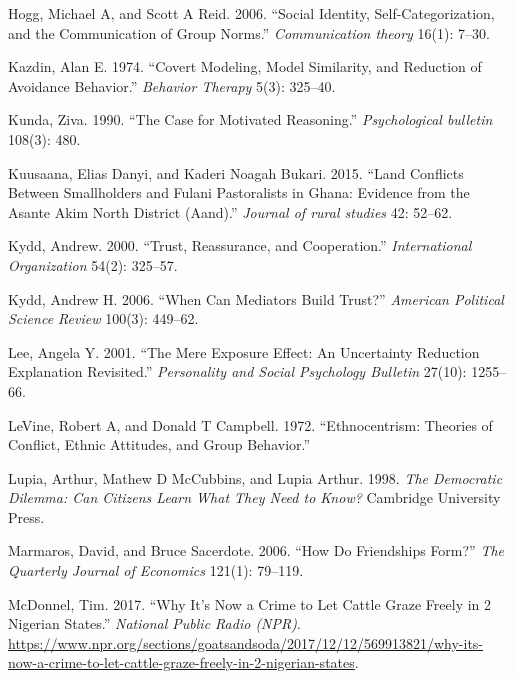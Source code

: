 \documentclass[11pt]{article}
\begin{document}
\leavevmode\hypertarget{ref-hogg2006social}{}%
Hogg, Michael A, and Scott A Reid. 2006. ``Social Identity,
Self-Categorization, and the Communication of Group Norms.''
\emph{Communication theory} 16(1): 7--30.

\leavevmode\hypertarget{ref-kazdin1974covertModeling}{}%
Kazdin, Alan E. 1974. ``Covert Modeling, Model Similarity, and Reduction
of Avoidance Behavior.'' \emph{Behavior Therapy} 5(3): 325--40.

\leavevmode\hypertarget{ref-kunda1990motivatedReasoning}{}%
Kunda, Ziva. 1990. ``The Case for Motivated Reasoning.''
\emph{Psychological bulletin} 108(3): 480.

\leavevmode\hypertarget{ref-kuusaana2015land}{}%
Kuusaana, Elias Danyi, and Kaderi Noagah Bukari. 2015. ``Land Conflicts
Between Smallholders and Fulani Pastoralists in Ghana: Evidence from the
Asante Akim North District (Aand).'' \emph{Journal of rural studies} 42:
52--62.

\leavevmode\hypertarget{ref-kydd2000trust}{}%
Kydd, Andrew. 2000. ``Trust, Reassurance, and Cooperation.''
\emph{International Organization} 54(2): 325--57.

\leavevmode\hypertarget{ref-kydd2006can}{}%
Kydd, Andrew H. 2006. ``When Can Mediators Build Trust?'' \emph{American
Political Science Review} 100(3): 449--62.

\leavevmode\hypertarget{ref-lee2001mere}{}%
Lee, Angela Y. 2001. ``The Mere Exposure Effect: An Uncertainty
Reduction Explanation Revisited.'' \emph{Personality and Social
Psychology Bulletin} 27(10): 1255--66.

\leavevmode\hypertarget{ref-levine1972ethnocentrism}{}%
LeVine, Robert A, and Donald T Campbell. 1972. ``Ethnocentrism: Theories
of Conflict, Ethnic Attitudes, and Group Behavior.''

\leavevmode\hypertarget{ref-lupia1998democratic}{}%
Lupia, Arthur, Mathew D McCubbins, and Lupia Arthur. 1998. \emph{The
Democratic Dilemma: Can Citizens Learn What They Need to Know?}
Cambridge University Press.

\leavevmode\hypertarget{ref-marmaros2006friendships}{}%
Marmaros, David, and Bruce Sacerdote. 2006. ``How Do Friendships Form?''
\emph{The Quarterly Journal of Economics} 121(1): 79--119.

\leavevmode\hypertarget{ref-mcdonnel2017graze}{}%
McDonnel, Tim. 2017. ``Why It's Now a Crime to Let Cattle Graze Freely
in 2 Nigerian States.'' \emph{National Public Radio (NPR)}.
\url{https://www.npr.org/sections/goatsandsoda/2017/12/12/569913821/why-its-now-a-crime-to-let-cattle-graze-freely-in-2-nigerian-states}.
\end{document}

